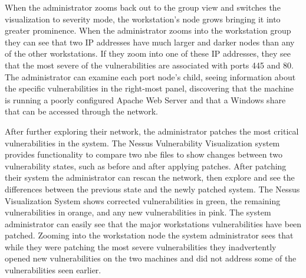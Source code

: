 \documentclass{acm_proc_article-sp}
\begin{document}
When the administrator zooms back out to the
group view and switches the visualization to severity mode, the workstation's
node grows bringing it into greater prominence. When the administrator
zooms into the workstation group they can see that two IP addresses have much
larger and darker nodes than any of the other workstations. If they zoom into
one of these IP addresses, they see that the most severe of the vulnerabilities
are associated with ports 445 and 80. The administrator can examine each port
node's child, seeing information about the specific vulnerabilities in the right-most
panel, discovering that the machine is running a poorly configured Apache
Web Server and that a Windows share that can be accessed through the network.

After further exploring their network, the administrator patches the most critical
vulnerabilities in the system. The Nessus Vulnerability Visualization system
provides functionality to compare two nbe files to show changes between two
vulnerability states, such as before and after applying patches. After patching
their system the administrator can rescan the network, then explore and see the
differences between the previous state and the newly patched system.
The Nessus Visualization System shows corrected
vulnerabilities in green, the remaining vulnerabilities in orange, and any new
vulnerabilities in pink. The system administrator can easily see that the
major workstations vulnerabilities have been patched. Zooming into the
workstation node the system administrator sees that while they were patching the most
severe vulnerabilities they inadvertently opened new vulnerabilities on the two
machines and did not address some of the vulnerabilities seen earlier.
\end{document}
